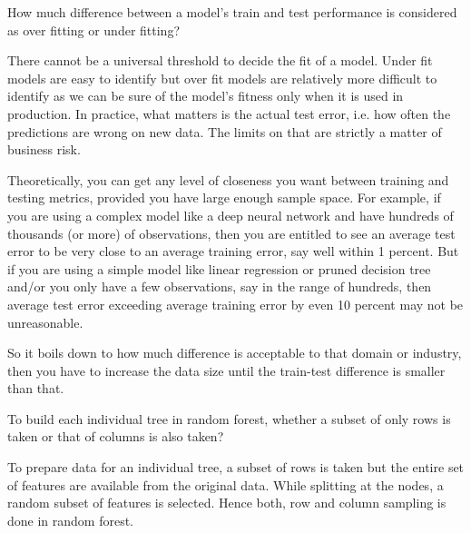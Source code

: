     \begin{qanda}
		\begin{question}
How much difference between a model's train and test performance is considered as over fitting or under fitting?
		\end{question}

		\begin{answer}
There cannot be a universal threshold to decide the fit of a model. Under fit models are easy to identify but over fit models are relatively more difficult to identify as we can be sure of the model's fitness only when it is used in production. In practice, what matters is the actual test error, i.e. how often the predictions are wrong on new data. The limits on that are strictly a matter of business risk.

Theoretically, you can get any level of closeness you want between training and testing metrics, provided you have large enough sample space.
For example, if you are using a complex model like a deep neural network and have hundreds of thousands (or more) of observations, then you are entitled to see an average test error to be very close to an average training error, say well within 1 percent. But if you are using a simple model like linear regression or pruned decision tree and/or you only have a few observations, say in the range of hundreds, then average test error exceeding average training error by even 10 percent may not be unreasonable.

So it boils down to how much difference is acceptable to that domain or industry, then you have to increase the data size until the train-test difference is smaller than that.
		\end{answer}
    \end{qanda}

    \begin{qanda}
		\begin{question}
To build each individual tree in random forest, whether a subset of only rows is taken or that of columns is also taken?
		\end{question}

		\begin{answer}
To prepare data for an individual tree, a subset of rows is taken but the entire set of features are available from the original data.  While splitting at the nodes, a random subset of features is selected. Hence both, row and column sampling is done in random forest.
		\end{answer}
    \end{qanda}


